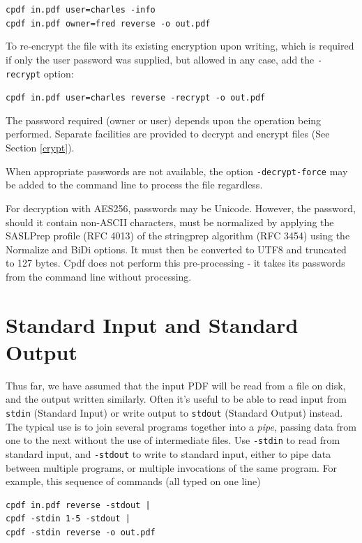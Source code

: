 \documentclass{book}
\begin{document}
\begin{framed}
\noindent\small\verb!cpdf in.pdf user=charles -info!\\
\noindent\small\verb!cpdf in.pdf owner=fred reverse -o out.pdf!
\end{framed}

\noindent To re-encrypt the file with its existing encryption upon writing, which is required if only the user password was supplied, but allowed in any case, add the \texttt{-recrypt} option:

\begin{framed}
\noindent\small\verb!cpdf in.pdf user=charles reverse -recrypt -o out.pdf!
\end{framed}

\noindent The password required (owner or user) depends upon the operation
being performed. Separate facilities are provided to decrypt and encrypt files
(See Section \ref{crypt}).

When appropriate passwords are not available, the option \texttt{-decrypt-force} may be added to the command line to process the file regardless.

For decryption with AES256, passwords may be Unicode. However, the password, should it contain non-ASCII characters, must be normalized by applying the SASLPrep profile (RFC 4013) of the stringprep algorithm (RFC 3454) using the Normalize and BiDi options. It must then be converted to UTF8 and truncated to 127 bytes. Cpdf does not perform this pre-processing - it takes its passwords from the command line without processing.

  \section{Standard Input and Standard Output}
 
  Thus far, we have assumed that the input PDF will be read from a file on
disk, and the output written similarly. Often it's useful to be able to read
input from \texttt{stdin} (Standard Input) or write output to \texttt{stdout}
(Standard Output) instead. The typical use is to join several programs
together into a \textit{pipe}, passing data from one to the next without the
use of intermediate files. Use \texttt{-stdin} to read from standard input, and
\texttt{-stdout} to write to standard input, either to pipe data between
multiple programs, or multiple invocations of the same program. For example, this sequence of commands (all typed on one line)

  \begin{framed}
  \noindent\small\begin{verbatim}cpdf in.pdf reverse -stdout |
cpdf -stdin 1-5 -stdout |
cpdf -stdin reverse -o out.pdf\end{verbatim}
  \end{framed}
\end{document}
